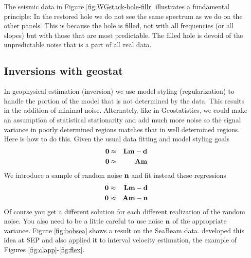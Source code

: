 \par
The seismic data in
Figure \ref{fig:WGstack-hole-fillr}
illustrates a fundamental principle:
In the restored hole we do not see the same spectrum
as we do on the other panels.
This is because the hole is filled,
not with all frequencies (or all slopes) but with those
that are most predictable.
The filled hole is devoid of the unpredictable noise
that is a part of all real data.



\subsection{Inversions with geostat}
In geophysical estimation (inversion) we use model styling
(regularization) to handle the portion of the model that
is not determined by the data.
This results in the addition of minimal noise.
Alternately, like in Geostatistics,
we could make an assumption of statistical stationarity
and add much more noise so the signal variance in poorly determined
regions matches that in well determined regions.
Here is how to do this.
Given the usual data fitting and model styling goals
\begin{eqnarray}
\bold 0 &\approx& \bold L \bold m -\bold d
\\
\bold 0 &\approx& \bold A \bold m
\end{eqnarray}
We introduce a sample of random noise $\bold n$ and fit instead
these regressions
\begin{eqnarray}
\bold 0 &\approx& \bold L \bold m -\bold d
\\
\bold 0 &\approx& \bold A \bold m -\bold n
\end{eqnarray}
Of course you get a different solution for each different
realization of the random noise.
You also need to be a little careful to use noise $\bold n$
of the appropriate variance.
Figure \ref{fig:bobsea} shows a result on the SeaBeam data.
 developed this idea at SEP and also
applied it to interval velocity estimation,
the example of Figures \ref{fig:clapp}-\ref{fig:flex}.


